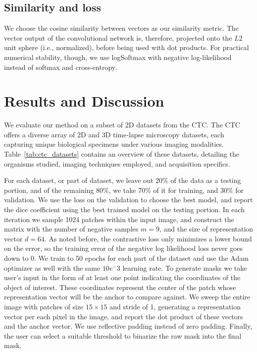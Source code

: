 \documentclass[./dissertation.tex]{subfiles}
\begin{document}
\subsection{Similarity and loss}
We choose the cosine similarity between vectors as our similarity metric. The vector output of the convolutional network is, therefore, projected onto the \(L2\) unit sphere (i.e., normalized), before being used with dot products. For practical numerical stability, though, we use logSoftmax with negative log-likelihood instead of softmax and cross-entropy.





\label{cc:Results and Discussion}
\section{Results and Discussion}

We evaluate our method on a subset of 2D datasets from the CTC. The CTC offers a diverse array of 2D and 3D time-lapse microscopy datasets, each capturing unique biological specimens under various imaging modalities. Table~\ref{tab:ctc_datasets} contains an overview of these datasets, detailing the organisms studied, imaging techniques employed, and acquisition specifics.

For each dataset, or part of dataset, we leave out 20\% of the data as a testing portion, and of the remaining 80\%, we take 70\% of it for training, and 30\% for validation. We use the loss on the validation to choose the best model, and report the dice coefficient using the best trained model on the testing portion. In each iteration we sample 1024 patches within the input image, and construct the matrix with the number of negative samples \(m = 9\), and the size of representation vector \(d = 64\). As noted before, the contrastive loss only minimizes a lower bound on the error, so the training error of the negative log likelihood loss never goes down to \(0\). We train to 50 epochs for each part of the dataset and use the Adam optimizer as well with the same \(10e^-3\) learning rate. To generate masks we take user's input in the form of at least one point indicating the coordinates of the object of interest. These coordinates represent the center of the patch whose representation vector will be the anchor to compare against. We sweep the entire image with patches of size \({15}\times{15}\) and stride of 1, generating a representation vector per each pixel in the image, and report the dot product of these vectors and the anchor vector. We use reflective padding instead of zero padding. Finally, the user can select a suitable threshold to binarize the raw mask into the final mask.
\end{document}
